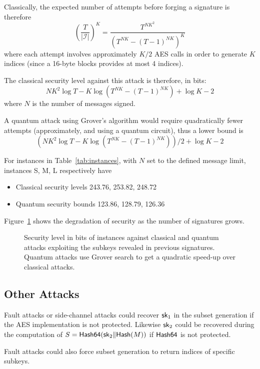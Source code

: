Classically, the expected number of attempts before forging a signature is therefore
\[
\left(\frac{T}{\vert \mathcal I\vert}\right)^K = \frac{T^{NK^2}}{(T^{NK} - (T-1)^{NK})^K}
\]
where each attempt involves approximately $K/2$ AES calls in order to generate $K$ indices (since a 16-byte blocks provides at most 4 indices).

The classical security level against this attack is therefore, in bits:
\[
NK^2 \log T - K \log(T^{NK} - (T-1)^{NK}) + \log K - 2
\]
where $N$ is the number of messages signed.

A quantum attack using Grover's algorithm would require quadratically fewer attempts (approximately, and using a quantum circuit), thus a lower bound is
\[
(NK^2 \log T - K \log(T^{NK} - (T-1)^{NK}))/2 + \log K - 2
\]

For \gravity instances in Table~\ref{tab:instances}, with $N$ set to the defined message limit, instances S, M, L respectively have
\begin{itemize}
    \item Classical security levels 243.76, 253.82, 248.72
    \item Quantum security bounds 123.86, 128.79, 126.36
\end{itemize}
Figure~\ref{fig:security} shows the degradation of security as the number of signatures grows.
 

\begin{figure}
\centering
\centering
\caption{Security level in bits of \gravity instances against classical and quantum attacks exploiting the subkeys revealed in previous signatures. Quantum attacks use Grover search to get a quadratic speed-up over classical attacks.}
\label{fig:security}
\end{figure}

\subsection{Other Attacks}

Fault attacks or side-channel attacks could recover $\mathsf{sk}_1$ in the subset generation if the AES implementation is not protected.
Likewise $\mathsf{sk}_2$ could be recovered during the computation of $S=\textsf{Hash64}(\mathsf{sk}_2 \Vert \textsf{Hash}(M))$ if $\textsf{Hash64}$ is not protected.

Fault attacks could also force subset generation to return indices of specific subkeys.

